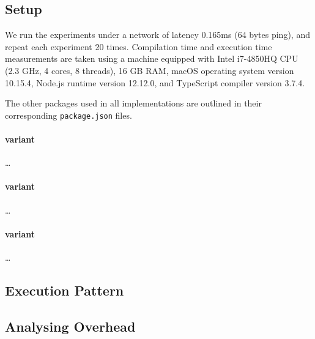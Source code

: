 \subsection{Setup}


We run the experiments under a network of latency 0.165ms
(64 bytes ping), and repeat each experiment 20 times.
Compilation time and execution time measurements 
are taken using a machine equipped with Intel i7-4850HQ CPU
(2.3 GHz, 4 cores, 8 threads), 16 GB RAM, macOS operating system 
version 10.15.4, Node.js runtime version 12.12.0, and
TypeScript compiler version 3.7.4.

The other packages used in all implementations are outlined in their
corresponding \texttt{package.json} files.

\paragraph{ variant}
\dots

\paragraph{ variant}
\dots

\paragraph{ variant}
\dots

\subsection{Execution Pattern}

\subsection{Analysing Overhead}

